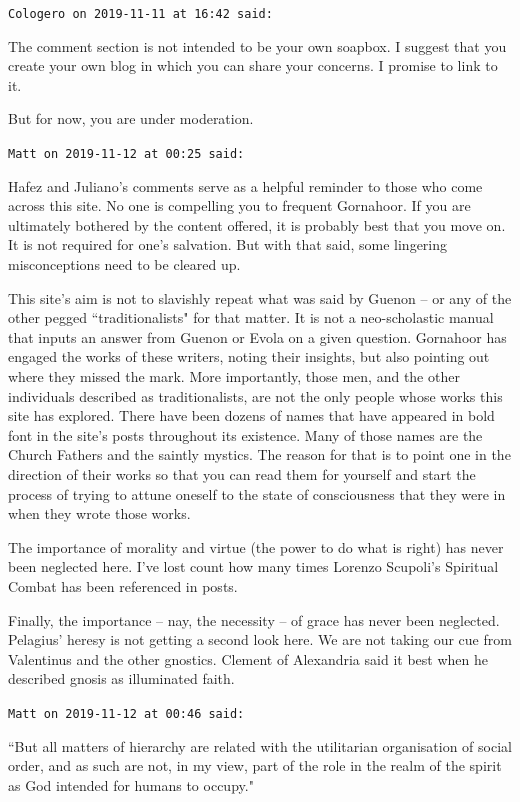 \begin{footnotesize}
\begin{sffamily}
\hfill

\texttt{Cologero on 2019-11-11 at 16:42 said: }

The comment section is not intended to be your own soapbox. I suggest that you create your own blog in which you can share your concerns. I promise to link to it.

But for now, you are under moderation.


\hfill

\texttt{Matt on 2019-11-12 at 00:25 said: }

Hafez and Juliano's comments serve as a helpful reminder to those who come across this site. No one is compelling you to frequent Gornahoor. If you are ultimately bothered by the content offered, it is probably best that you move on. It is not required for one's salvation. But with that said, some lingering misconceptions need to be cleared up. 

This site's aim is not to slavishly repeat what was said by Guenon – or any of the other pegged ``traditionalists" for that matter. It is not a neo-scholastic manual that inputs an answer from Guenon or Evola on a given question. Gornahoor has engaged the works of these writers, noting their insights, but also pointing out where they missed the mark. More importantly, those men, and the other individuals described as traditionalists, are not the only people whose works this site has explored. There have been dozens of names that have appeared in bold font in the site's posts throughout its existence. Many of those names are the Church Fathers and the saintly mystics. The reason for that is to point one in the direction of their works so that you can read them for yourself and start the process of trying to attune oneself to the state of consciousness that they were in when they wrote those works.

The importance of morality and virtue (the power to do what is right) has never been neglected here. I've lost count how many times Lorenzo Scupoli's Spiritual Combat has been referenced in posts.

Finally, the importance – nay, the necessity – of grace has never been neglected. Pelagius' heresy is not getting a second look here. We are not taking our cue from Valentinus and the other gnostics. Clement of Alexandria said it best when he described gnosis as illuminated faith.


\hfill

\texttt{Matt on 2019-11-12 at 00:46 said: }

``But all matters of hierarchy are related with the utilitarian organisation of social order, and as such are not, in my view, part of the role in the realm of the spirit as God intended for humans to occupy."


\end{sffamily}
\end{footnotesize}

